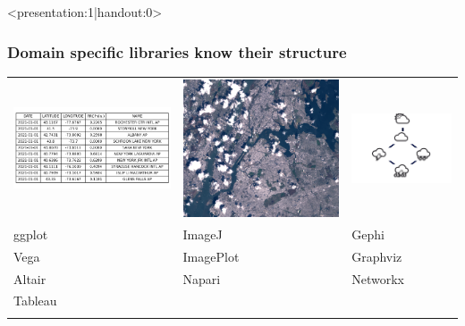 \documentclass[xcolor={dvipsnames}, handout]{beamer}
\begin{document}
\begin{frame}<presentation:1|handout:0>
    \frametitle{Domain specific libraries know their structure\cite{HeerSoftware2006}}
    \begin{table}
        \begin{tabular}{>{\onslide<1->}l>{\onslide<2->}l>{\onslide<3->}l}
            \includegraphics[width=.24\textwidth]{figures/intro/table.png} & \includegraphics[width=.3\textwidth]{figures/intro/landsat.png} & \includegraphics[width=.33\textwidth]{figures/math/graph.png} \\
            ggplot\cite{wickhamGgplot2ElegantGraphics2016a}  & ImageJ\cite{schneiderNIHImageImageJ2012}& Gephi\cite{bastianGephiOpenSource2009}\\
            Vega\cite{satyanarayanDeclarativeInteractionDesign2014} & ImagePlot\cite{studiesCulturevisImageplot2021} & Graphviz\cite{ellsonGraphvizOpenSource2002}\\
            Altair\cite{vanderplasAltairInteractiveStatistical2018}& Napari\cite{nicholas_sofroniew_2021_4533308} & Networkx\cite{HagbergExploringNetwork2008}\\
             Tableau \cite{StoltePolaris2002}& &\\
            \cite{hanrahanVizQL2006,MackinlayShowme2007}&&\\        
        \end{tabular}
    \end{table}
\end{frame}
\end{document}
